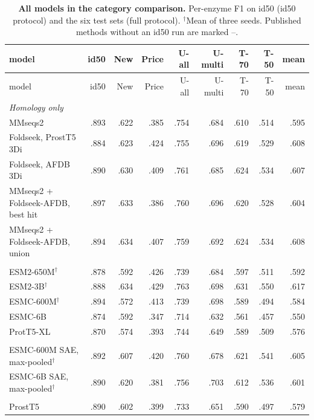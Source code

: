 \documentclass[11pt]{article}
\begin{document}
{\footnotesize\setlength{\tabcolsep}{4pt}
\begin{longtable}{@{}lrrrrrrrr@{}}
\caption{\textbf{All models in the category comparison.} Per-enzyme F1 on id50 (id50 protocol) and the six test sets
(full protocol). $^{\dagger}$Mean of three seeds. Published methods without an id50 run are marked --.}
\label{tab:all}\\
\toprule
model & id50 & New & Price & U-all & U-multi & T-70 & T-50 & mean \\
\midrule
\endfirsthead
\toprule
model & id50 & New & Price & U-all & U-multi & T-70 & T-50 & mean \\
\midrule
\endhead
\multicolumn{9}{l}{\textit{Homology only}}\\
\quad MMseqs2 & .893 & .622 & .385 & .754 & .684 & .610 & .514 & .595 \\
\quad Foldseek, ProstT5 3Di & .884 & .623 & .424 & .755 & .696 & .619 & .529 & .608 \\
\quad Foldseek, AFDB 3Di & .890 & .630 & .409 & .761 & .685 & .624 & .534 & .607 \\
\quad MMseqs2 + Foldseek-AFDB, best hit & .897 & .633 & .386 & .760 & .696 & .620 & .528 & .604 \\
\quad MMseqs2 + Foldseek-AFDB, union & .894 & .634 & .407 & .759 & .692 & .624 & .534 & .608 \\
\addlinespace\multicolumn{9}{l}{\textit{Sequence PLM}}\\
\quad ESM2-650M$^{\dagger}$ & .878 & .592 & .426 & .739 & .684 & .597 & .511 & .592 \\
\quad ESM2-3B$^{\dagger}$ & .888 & .634 & .429 & .763 & .698 & .631 & .550 & .617 \\
\quad ESMC-600M$^{\dagger}$ & .894 & .572 & .413 & .739 & .698 & .589 & .494 & .584 \\
\quad ESMC-6B & .874 & .592 & .347 & .714 & .632 & .561 & .457 & .550 \\
\quad ProtT5-XL & .870 & .574 & .393 & .744 & .649 & .589 & .509 & .576 \\
\addlinespace\multicolumn{9}{l}{\textit{PLM + SAE features}}\\
\quad ESMC-600M SAE, max-pooled$^{\dagger}$ & .892 & .607 & .420 & .760 & .678 & .621 & .541 & .605 \\
\quad ESMC-6B SAE, max-pooled$^{\dagger}$ & .890 & .620 & .381 & .756 & .703 & .612 & .536 & .601 \\
\addlinespace\multicolumn{9}{l}{\textit{Structure-aware PLM}}\\
\quad ProstT5 & .890 & .602 & .399 & .733 & .651 & .590 & .497 & .579 \\

\end{longtable}}
\end{document}
